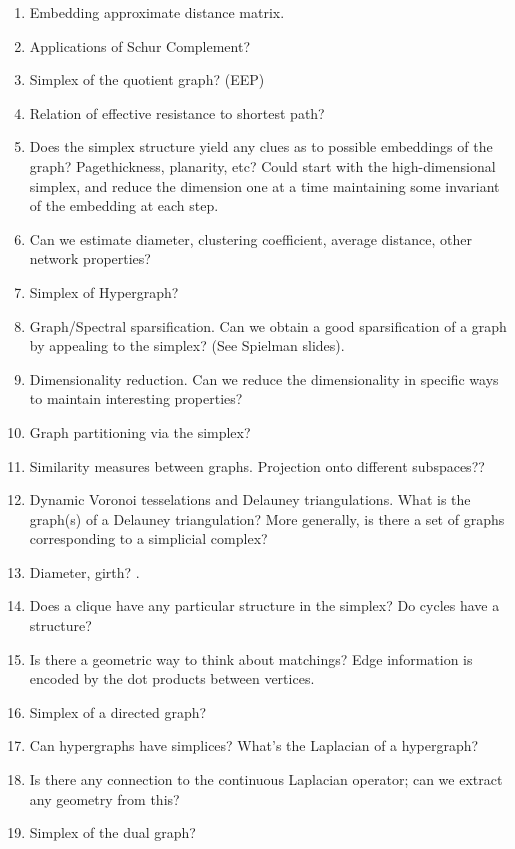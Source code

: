 \begin{enumerate}
\item Embedding approximate distance matrix. 
\item Applications of Schur Complement? 
    \item Simplex of the quotient graph? (EEP)
    \item Relation of effective resistance to shortest path?
    \item Does the simplex structure yield any clues as to possible embeddings of the graph? Pagethickness, planarity, etc? Could start with the high-dimensional simplex, and reduce the dimension one at a time maintaining some invariant of the embedding at each step. 
    \item Can we estimate diameter, clustering coefficient, average distance, other network properties?
    \item Simplex of Hypergraph? 
    \item Graph/Spectral sparsification. Can we obtain a good sparsification of a graph by appealing to the simplex? (See Spielman slides). 
    \item Dimensionality reduction. Can we reduce the dimensionality in specific ways to maintain interesting properties? 
    \item Graph partitioning via the simplex? 
    \item Similarity measures between graphs. Projection onto different subspaces??
    \item Dynamic Voronoi tesselations and Delauney triangulations. What is the graph(s) of a Delauney triangulation? More generally, is there a set of graphs corresponding to a simplicial complex? 

    \item Diameter, girth? . 
    \item Does a clique have any particular structure in the simplex? Do cycles have a structure? 
    \item Is there a geometric way to think about matchings? Edge information is encoded by the dot products between vertices. 
    \item Simplex of a directed graph?  
    \item Can hypergraphs have simplices? What's the Laplacian of a hypergraph? 
    \item Is there any connection to the continuous Laplacian operator; can we extract any geometry from this?
    \item Simplex of the dual graph?
    

\end{enumerate}

